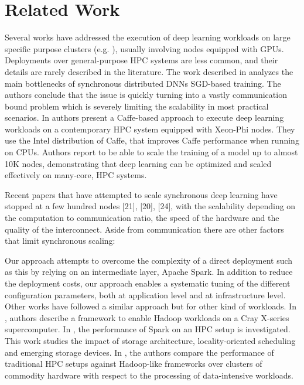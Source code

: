 \documentclass[journal]{IEEEtran}
\begin{document}


\section{Related Work}
\label{sec:rw}

Several works have addressed the execution of deep learning workloads on large specific purpose clusters (e.g. \cite{DBLP:journals/corr/abs-1708-02983}), usually involving nodes equipped with GPUs. Deployments over general-purpose HPC systems are less common, and their details are rarely described in the literature. The work described in \cite{DBLP:conf/sc/KeuperP16} analyzes the main bottlenecks of synchronous distributed DNNs SGD-based training. The authors conclude that the issue is quickly turning into a vastly communication bound problem which is severely limiting the scalability in most practical scenarios. In \cite{DBLP:journals/corr/abs-1708-05256} authors present a Caffe-based approach to execute deep learning workloads on a contemporary HPC system equipped with Xeon-Phi nodes. They use the Intel distribution of Caffe, that improves Caffe performance when running on CPUs. Authors report to be able to scale the training of a model up to almost 10K nodes, demonstrating that deep learning can be optimized and scaled effectively on many-core, HPC systems. 

Recent papers
that have attempted to scale synchronous deep learning
have stopped at a few hundred nodes [21], [20], [24],
with the scalability depending on the computation to
communication ratio, the speed of the hardware and the
quality of the interconnect. Aside from communication
there are other factors that limit synchronous scaling:




Our approach attempts to overcome the complexity of a direct deployment such as this by relying on an intermediate layer, Apache Spark. In addition to reduce the deployment costs, our approach enables a systematic tuning of the different configuration parameters, both at application level and at infrastructure level. Other works have followed a similar approach but for other kind of workloads. In \cite{michael2014}, authors describe a framework to enable Hadoop workloads on a Cray X-series supercomputer. In \cite{wang2014}, the performance of Spark on an HPC setup is investigated. This work studies the impact of storage architecture, locality-oriented scheduling and emerging storage devices. In \cite{jha2014}, the authors compare the performance of traditional HPC setups against Hadoop-like frameworks over clusters of commodity hardware with respect to the processing of data-intensive workloads. 
\end{document}
